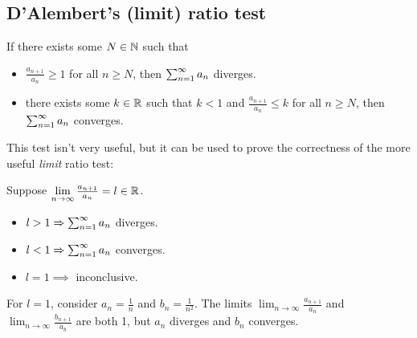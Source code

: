 
\subsection{D'Alembert's (limit) ratio test}
\begin{test}
  If there exists some $N \in \mathbb{N}$ such that
  \begin{itemize}
    \item $\frac{a_{n + 1}}{a_n} \geq 1$ for all $n \geq N$, then $\sum_{n = 1} ^ \infty a_n$ diverges.
    \item there exists some $k \in \mathbb{R}$ such that $k < 1$ and $\frac{a_{n + 1}}{a_n} \leq k$ for all $n \geq N$, then $\sum_{n = 1} ^ \infty a_n$ converges.
  \end{itemize}
\end{test}
This test isn't very useful, but it can be used to prove the correctness of the more useful \textit{limit} ratio test:
\begin{test}
  Suppose $\lim_{n \to \infty} \frac{a_{n + 1}}{a_n} = l \in \R$.
  \begin{itemize}
    \item $l > 1 \Rightarrow \sum_{n = 1} ^ \infty a_n$ diverges.
    \item $l < 1 \Rightarrow \sum_{n = 1} ^ \infty a_n$ converges.
    \item $l = 1 \implies$ inconclusive.
  \end{itemize}
\end{test}
For $l = 1$, consider $a_n = \frac{1}{n}$ and $b_n = \frac{1}{n ^ 2}$. The limits $\lim_{n \to \infty} \frac{a_{n + 1}}{a_n}$ and $\lim_{n \to \infty} \frac{b_{n + 1}}{a_b}$ are both 1, but $a_n$ diverges and $b_n$ converges.

